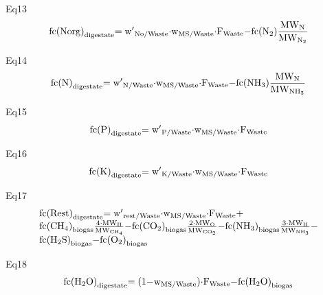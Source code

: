 \documentclass[10pt,a4paper]{article}
\begin{document}
Eq13
\begin{align}
	{\rm{fc(Norg}}{{\rm{)}}_{{\rm{digestate}}}}{\rm{ = w}}{{\rm{'}}_{{\rm{No/Waste}}}}{\rm{\cdot}}{{\rm{w}}_{{\rm{MS/Waste}}}}{\rm{\cdot}}{{\rm{F}}_{{\rm{Waste}}}}{\rm{ - fc(}}{{\rm{N}}_{\rm{2}}}{\rm{)}}\frac{{{\rm{M}}{{\rm{W}}_{\rm{N}}}}}{{{\rm{M}}{{\rm{W}}_{{{\rm{N}}_{\rm{2}}}}}}}
\end{align}

Eq14
\begin{align}
	{\rm{fc(N}}{{\rm{)}}_{{\rm{digestate}}}}{\rm{ = w}}{{\rm{'}}_{{\rm{N/Waste}}}}{\rm{\cdot}}{{\rm{w}}_{{\rm{MS/Waste}}}}{\rm{\cdot}}{{\rm{F}}_{{\rm{Waste}}}}{\rm{ - fc(N}}{{\rm{H}}_{\rm{3}}}{\rm{)}}\frac{{{\rm{M}}{{\rm{W}}_{\rm{N}}}}}{{{\rm{M}}{{\rm{W}}_{{\rm{N}}{{\rm{H}}_{\rm{3}}}}}}}	
\end{align}

Eq15
\begin{align}
	{\rm{fc(P}}{{\rm{)}}_{{\rm{digestate}}}}{\rm{ = w}}{{\rm{'}}_{{\rm{P/Waste}}}}{\rm{\cdot}}{{\rm{w}}_{{\rm{MS/Waste}}}}{\rm{\cdot}}{{\rm{F}}_{{\rm{Waste}}}}
\end{align}

Eq16
\begin{align}
	{\rm{fc(K}}{{\rm{)}}_{{\rm{digestate}}}}{\rm{ = w}}{{\rm{'}}_{{\rm{K/Waste}}}}{\rm{\cdot}}{{\rm{w}}_{{\rm{MS/Waste}}}}{\rm{\cdot}}{{\rm{F}}_{{\rm{Waste}}}}
\end{align}

Eq17
\begin{align}
	\begin{array}{l}{\rm{fc(Rest}}{{\rm{)}}_{{\rm{digestate}}}}{\rm{ = w}}{{\rm{'}}_{{\rm{rest/Waste}}}}{\rm{\cdot}}{{\rm{w}}_{{\rm{MS/Waste}}}}{\rm{\cdot}}{{\rm{F}}_{{\rm{Waste}}}}{\rm{ + }}\\{\rm{fc(C}}{{\rm{H}}_{\rm{4}}}{{\rm{)}}_{{\rm{biogas}}}}\frac{{{\rm{4\cdot M}}{{\rm{W}}_{\rm{H}}}}}{{{\rm{M}}{{\rm{W}}_{{\rm{C}}{{\rm{H}}_{\rm{4}}}}}}}{\rm{ - fc(C}}{{\rm{O}}_{\rm{2}}}{{\rm{)}}_{{\rm{biogas}}}}\frac{{{\rm{2\cdot M}}{{\rm{W}}_{\rm{O}}}}}{{{\rm{M}}{{\rm{W}}_{{\rm{C}}{{\rm{O}}_{\rm{2}}}}}}}{\rm{ - fc(N}}{{\rm{H}}_{\rm{3}}}{{\rm{)}}_{{\rm{biogas}}}}\frac{{{\rm{3\cdot M}}{{\rm{W}}_{\rm{H}}}}}{{{\rm{M}}{{\rm{W}}_{{\rm{N}}{{\rm{H}}_{\rm{3}}}}}}}{\rm{ - }}\\{\rm{fc(}}{{\rm{H}}_{\rm{2}}}{\rm{S}}{{\rm{)}}_{{\rm{biogas}}}}{\rm{ - fc(}}{{\rm{O}}_{\rm{2}}}{{\rm{)}}_{{\rm{biogas}}}}\end{array}
\end{align}

Eq18
\begin{align}
	{\rm{fc(}}{{\rm{H}}_{\rm{2}}}{\rm{O}}{{\rm{)}}_{{\rm{digestate}}}}{\rm{ = (1 - }}{{\rm{w}}_{{\rm{MS/Waste}}}}{\rm{)\cdot}}{{\rm{F}}_{{\rm{Waste}}}}{\rm{ - fc(}}{{\rm{H}}_{\rm{2}}}{\rm{O}}{{\rm{)}}_{{\rm{biogas}}}}
\end{align}
\end{document}
